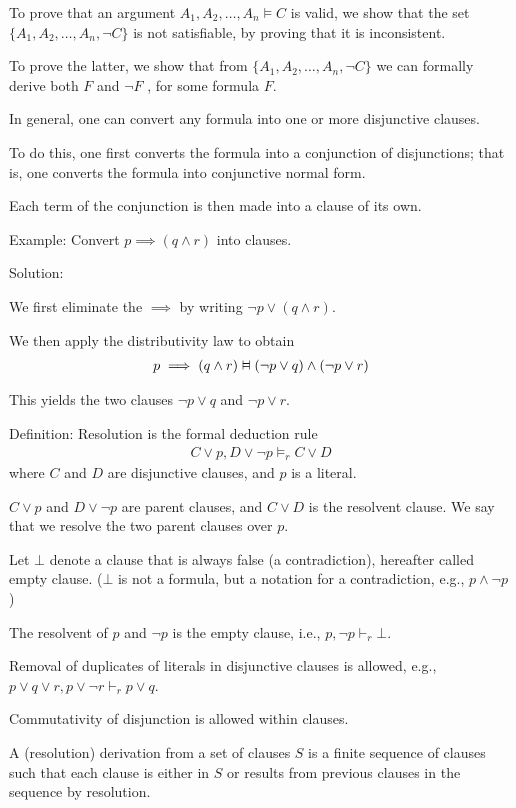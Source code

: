 \documentclass{article}
\newcommand{\vDashv}{%
  \mathrel{%
    \text{%
      \ooalign{$\vDash$\cr\reflectbox{$\vDash$}\cr}%
    }%
  }%
}
\begin{document}
To prove that an argument $A_1, A_2, \ldots, A_n \vDash C$ is valid, we show that the set $\{A_1, A_2, \ldots, A_n, \neg C\}$ is not satisfiable, by proving that it is inconsistent. 

To prove the latter, we show that from $\{A_1, A_2, \ldots, A_n, \neg C\}$ we can formally derive both $F$ and $\neg F$ , for some formula $F$.

In general, one can convert any formula into one or more disjunctive clauses. 

To do this, one first converts the formula into a conjunction of disjunctions; that is, one converts the formula into conjunctive normal form. 

Each term of the conjunction is then made into a clause of its own.

Example: Convert $p \implies (q \wedge r)$ into clauses.

Solution:

We first eliminate the $\implies$ by writing $\neg p \vee (q \wedge r)$.

We then apply the distributivity law to obtain
\begin{align*}
p \implies (q \wedge r) \vDashv (\neg p \vee q ) \wedge (\neg p \vee r)
\end{align*}

This yields the two clauses $\neg p \vee q$ and $\neg p \vee r$.

Definition: Resolution is the formal deduction rule
\begin{align*}
C \vee p, D \vee \neg p \vDash_r C \vee D
\end{align*}
where $C$ and $D$ are disjunctive clauses, and $p$ is a literal.

$C \vee p$ and $D \vee \neg p$ are parent clauses, and $C \vee D$ is the resolvent clause. We say that we resolve the two parent clauses over $p$.

Let $\bot$ denote a clause that is always false (a contradiction), hereafter called empty clause. ($\bot$ is not a formula, but a notation for a contradiction, e.g., $p \wedge \neg p$)

The resolvent of $p$ and $\neg p$ is the empty clause, i.e., $p, \neg p \vdash_r \bot$.

Removal of duplicates of literals in disjunctive clauses is allowed, e.g., $p \vee q \vee r, p \vee \neg r \vdash_r p \vee q$.

Commutativity of disjunction is allowed within clauses.

A (resolution) derivation from a set of clauses $S$ is a finite sequence of clauses such that each clause is either in $S$ or results from previous clauses in the sequence by resolution.
\end{document}
